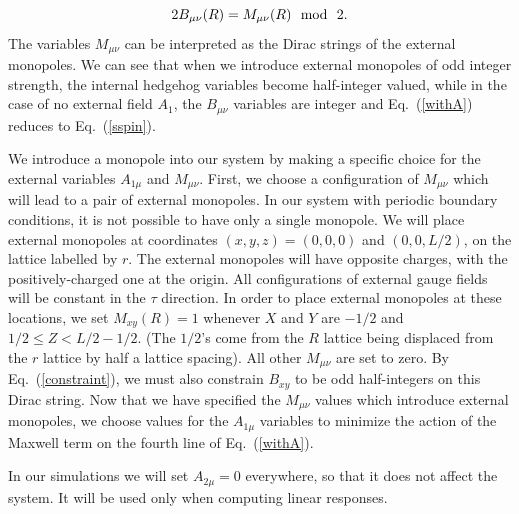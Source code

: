 \documentclass[prb,twocolumn]{revtex4-1}
\begin{document}
\begin{equation}
2B_{\mu\nu}(R)=M_{\mu\nu}(R) ~~{\rm mod}~~2. 
\label{constraint}
\end{equation}
The variables $M_{\mu\nu}$ can be interpreted as the Dirac strings of the external monopoles. 
We can see that when we introduce external monopoles of odd integer strength, the internal hedgehog variables become half-integer valued, while in the case of no external field $A_1$, the $B_{\mu\nu}$ variables are integer and Eq.~(\ref{withA}) reduces to Eq.~(\ref{sspin}). 

We introduce a monopole into our system by making a specific choice for the external variables $A_{1\mu}$ and $M_{\mu\nu}$. First, we choose a configuration of $M_{\mu\nu}$ which will lead to a pair of external monopoles. In our system with periodic boundary conditions, it is not possible to have only a single monopole. We will place external monopoles at coordinates $(x,y,z)=(0,0,0)$ and $(0,0,L/2)$, on the lattice labelled by $r$. The external monopoles will have opposite charges, with the positively-charged one at the origin. All configurations of external gauge fields will be constant in the $\tau$ direction. In order to place external monopoles at these locations, we set $M_{xy}(R)=1$ whenever $X$ and $Y$ are $-1/2$ and $1/2\leq Z<L/2-1/2$. (The $1/2$'s come from the $R$ lattice being displaced from the $r$ lattice by half a lattice spacing). All other $M_{\mu\nu}$ are set to zero. By Eq.~(\ref{constraint}), we must also constrain $B_{xy}$ to be odd half-integers on this Dirac string. Now that we have specified the $M_{\mu\nu}$ values which introduce external monopoles, we choose values for the $A_{1\mu}$ variables to minimize the action of the Maxwell term on the fourth line of Eq.~(\ref{withA}). 

In our simulations we will set $A_{2\mu}=0$ everywhere, so that it does not affect the system. It will be used only when computing linear responses. 
\end{document}
